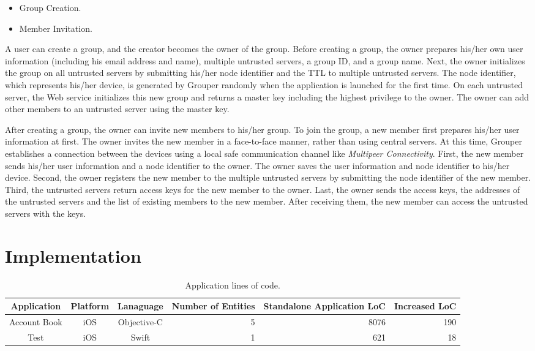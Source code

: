 \documentclass[sigconf]{acmart}
\begin{document}
\begin{itemize}
	\setlength{\itemsep}{1pt}
	\setlength{\parskip}{0pt}
	\setlength{\parsep}{0pt}
	\item Group Creation.
	\item Member Invitation.
\end{itemize}

A user can create a group, and the creator becomes the owner of the group.  
Before creating a group, the owner prepares his/her own user information (including his email address and name), multiple untrusted servers, a group ID, and a group name. 
Next, the owner initializes the group on all untrusted servers by submitting his/her node identifier and the TTL to multiple untrusted servers. 
The node identifier, which represents his/her device, is generated by Grouper randomly when the application is launched for the first time. 
On each untrusted server, the Web service initializes this new group and returns a master key including the highest privilege to the owner. 
The owner can add other members to an untrusted server using the master key.

After creating a group, the owner can invite new members to his/her group. 
To join the group, a new member first prepares his/her user information at first. 
The owner invites the new member in a face-to-face manner, rather than using central servers. 
At this time, Grouper establishes a connection between the devices using a local safe communication channel like \emph{Multipeer Connectivity}\cite{mc}. 
First, the new member sends his/her user information and a node identifier to the owner. 
The owner saves the user information and node identifier to his/her device. 
Second, the owner registers the new member to the multiple untrusted servers by submitting the node identifier of the new member. 
Third, the untrusted servers return access keys for the new member to the owner. 
Last, the owner sends the access keys, the addresses of the untrusted servers and the list of existing members to the new member. 
After receiving them, the new member can access the untrusted servers with the keys.

\section{Implementation}

\begin{table}[t]
	\small
	\centering
	\caption{Application lines of code.}
	\label{my-label}
	\begin{tabular}{cccccc}
		\hline
		\textbf{Application} & \textbf{Platform} & \textbf{Lanaguage} & \textbf{Number of Entities} & \textbf{Standalone Application LoC} & \textbf{Increased LoC} \\ \hline
		Account Book & iOS & Objective-C & \multicolumn{1}{r}{5} & \multicolumn{1}{r}{8076} & \multicolumn{1}{r}{190} \\ 
		Test & iOS & Swift & \multicolumn{1}{r}{1} & \multicolumn{1}{r}{621} & \multicolumn{1}{r}{18} \\  \hline 
	\end{tabular}
\end{table}
\end{document}
